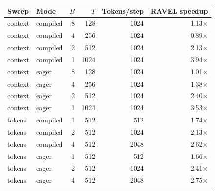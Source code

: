 \begin{tabular}{llrrrr}
\toprule
Sweep & Mode & $B$ & $T$ & Tokens/step & RAVEL speedup \\
\midrule
context & compiled & 8 & 128 & 1024 & 1.13$\times$ \\
context & compiled & 4 & 256 & 1024 & 0.89$\times$ \\
context & compiled & 2 & 512 & 1024 & 2.13$\times$ \\
context & compiled & 1 & 1024 & 1024 & 3.94$\times$ \\
context & eager & 8 & 128 & 1024 & 1.01$\times$ \\
context & eager & 4 & 256 & 1024 & 1.38$\times$ \\
context & eager & 2 & 512 & 1024 & 2.40$\times$ \\
context & eager & 1 & 1024 & 1024 & 3.53$\times$ \\
tokens & compiled & 1 & 512 & 512 & 1.74$\times$ \\
tokens & compiled & 2 & 512 & 1024 & 2.13$\times$ \\
tokens & compiled & 4 & 512 & 2048 & 2.62$\times$ \\
tokens & eager & 1 & 512 & 512 & 1.66$\times$ \\
tokens & eager & 2 & 512 & 1024 & 2.41$\times$ \\
tokens & eager & 4 & 512 & 2048 & 2.75$\times$ \\
\bottomrule
\end{tabular}
